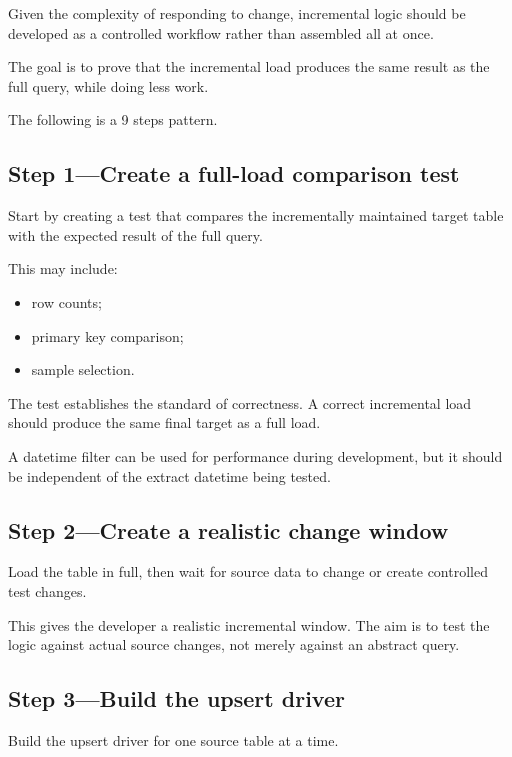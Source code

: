\documentclass[10pt,openany,10pt]{book}
\providecommand{\tightlist}{%
  \setlength{\itemsep}{0pt}\setlength{\parskip}{0pt}}
\begin{document}
Given the complexity of responding to change, incremental logic should
be developed as a controlled workflow rather than assembled all at once.

The goal is to prove that the incremental load produces the same result
as the full query, while doing less work.

The following is a 9 steps pattern.

\subsection{Step 1---Create a full-load comparison
test}\label{step-1create-a-full-load-comparison-test}

Start by creating a test that compares the incrementally maintained
target table with the expected result of the full query.

This may include:

\begin{itemize}
\tightlist
\item
  row counts;
\item
  primary key comparison;
\item
  sample selection.
\end{itemize}

The test establishes the standard of correctness. A correct incremental
load should produce the same final target as a full load.

A datetime filter can be used for performance during development, but it
should be independent of the extract datetime being tested.

\subsection{Step 2---Create a realistic change
window}\label{step-2create-a-realistic-change-window}

Load the table in full, then wait for source data to change or create
controlled test changes.

This gives the developer a realistic incremental window. The aim is to
test the logic against actual source changes, not merely against an
abstract query.

\subsection{Step 3---Build the upsert
driver}\label{step-3build-the-upsert-driver}

Build the upsert driver for one source table at a time.
\end{document}
